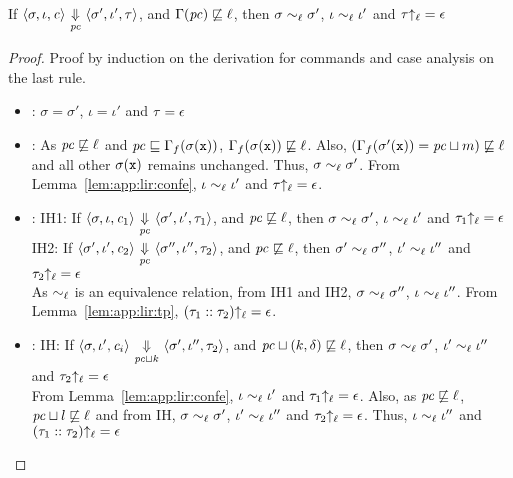 \begin{myLemma}[Confinement]
  \label{lem:app:lir:conf}
  If $\langle \sigma, \iota, \mathit{c} \rangle
  {~\underset{\mathit{pc}}{\Downarrow}~} \langle \sigma', \iota', \tau \rangle$,
  and $\Gamma(\mathit{pc}) \not\sqsubseteq \ell$, then $\sigma \sim_\ell
  \sigma'$, $\iota \sim_\ell \iota'$ and $\tau{\uparrow_\ell} = \epsilon$
\end{myLemma}

\begin{proof}
  Proof by induction on the derivation for commands and case analysis on
  the last rule.

  \begin{itemize}[leftmargin=.5in]
  \item{}: $\sigma = \sigma'$, $\iota = \iota'$ and $\tau =
    \epsilon$

  \item{}: As $\mathit{pc} \not\sqsubseteq \ell$ and $\mathit{pc} \sqsubseteq
    \Gamma_f(\sigma(\texttt{x}))$, $\Gamma_f(\sigma(\texttt{x})) \not\sqsubseteq
    \ell$. Also, $(\Gamma_f(\sigma'(\texttt{x})) = \mathit{pc} \sqcup m)
    \not\sqsubseteq \ell$ and all other $\sigma(\texttt{x})$ remains
    unchanged. Thus, $\sigma \sim_\ell \sigma'$. From
    Lemma~\ref{lem:app:lir:confe}, $\iota \sim_\ell \iota'$ and $\tau{\uparrow_\ell}
    = \epsilon$.

  \item{}: IH1: If $\langle \sigma, \iota, \mathit{c}_1 \rangle
    {~\underset{\mathit{pc}}{\Downarrow}~} \langle \sigma', \iota', \tau_1 \rangle$,
    and $\mathit{pc} \not\sqsubseteq \ell$, then $\sigma \sim_\ell
    \sigma'$, $\iota \sim_\ell \iota'$ and $\tau_1{\uparrow_\ell} =
    \epsilon$\\
    IH2: If $\langle \sigma', \iota', \mathit{c}_2 \rangle
    {~\underset{\mathit{pc}}{\Downarrow}~} \langle \sigma'', \iota'', \tau_2 \rangle$,
    and $\mathit{pc} \not\sqsubseteq \ell$, then $\sigma' \sim_\ell
    \sigma''$, $\iota' \sim_\ell \iota''$ and $\tau_2{\uparrow_\ell} =
    \epsilon$\\
    As $\sim_\ell$ is an equivalence relation, from IH1 and IH2,
    $\sigma \sim_\ell \sigma''$, $\iota \sim_\ell \iota''$. From
    Lemma~\ref{lem:app:lir:tp}, $(\tau_1 :: \tau_2) {\uparrow_\ell} = \epsilon$.

  \item{}: IH: If $\langle \sigma, \iota', \mathit{c}_i \rangle
    {~\underset{\mathit{pc}\sqcup k}{\Downarrow}~} \langle \sigma', \iota'', \tau_2 \rangle$,
    and $\mathit{pc} \sqcup (k, \delta) \not\sqsubseteq \ell$, then $\sigma \sim_\ell
    \sigma'$, $\iota' \sim_\ell \iota''$ and $\tau_2{\uparrow_\ell} =
    \epsilon$\\
    From Lemma~\ref{lem:app:lir:confe}, $\iota \sim_\ell \iota'$
    and $\tau_1{\uparrow_\ell} = \epsilon$. Also, as $\mathit{pc} \not\sqsubseteq
    \ell$, $\mathit{pc} \sqcup l \not\sqsubseteq \ell$ and from IH,
    $\sigma \sim_\ell \sigma'$, $\iota' \sim_\ell \iota''$ and
    $\tau_2{\uparrow_\ell} = \epsilon$. Thus, $\iota \sim_\ell \iota''$ and
    $(\tau_1::\tau_2){\uparrow_\ell} = \epsilon$


\end{itemize}
\end{proof}
